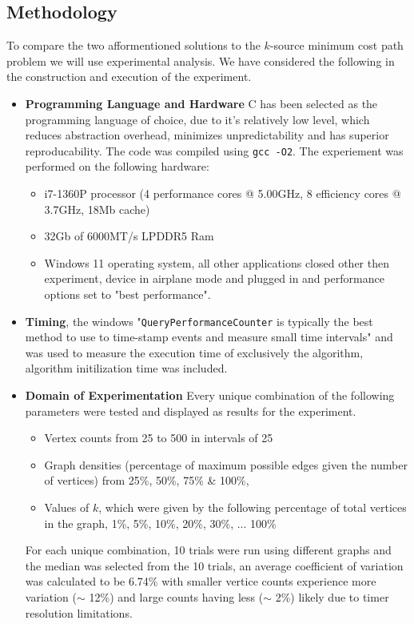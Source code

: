\documentclass{article}
\begin{document}
\subsection*{Methodology}
To compare the two afformentioned solutions to the $k$-source minimum cost path problem we will use experimental analysis. We have considered the following in the construction and execution of the experiment. 
\begin{itemize}
    \item \textbf{Programming Language and Hardware} C has been selected as the programming language of choice, due to it's relatively low level, which reduces abstraction overhead, minimizes unpredictability and has superior reproducability. The code was compiled using \texttt{gcc -O2}. The experiement was performed on the following hardware:
    \begin{itemize}
        \item i7-1360P processor (4 performance cores @ 5.00GHz, 8 efficiency cores @ 3.7GHz, 18Mb cache)
        \item 32Gb of 6000MT/s LPDDR5 Ram
        \item Windows 11 operating system, all other applications closed other then experiment, device in airplane mode and plugged in and performance options set to "best performance".
    \end{itemize}
    \item \textbf{Timing}, the windows "\texttt{QueryPerformanceCounter} is typically the best method to use to time-stamp events and measure small time intervals"\cite{microsoft_qpc} and was used to measure the execution time of exclusively the algorithm, algorithm initilization time was included. 
    \item \textbf{Domain of Experimentation} Every unique combination of the following parameters were tested and displayed as results for the experiment.
    \begin{itemize}
        \item Vertex counts from 25 to 500 in intervals of 25
        \item Graph densities (percentage of maximum possible edges given the number of vertices) from 25\%, 50\%, 75\% \& 100\%, 
        \item Values of $k$, which were given by the following percentage of total vertices in the graph, 1\%, 5\%, 10\%, 20\%, 30\%, ... 100\%
    \end{itemize}
    For each unique combination, 10 trials were run using different graphs and the median was selected from the 10 trials, an average coefficient of variation was calculated to be 6.74\% with smaller vertice counts experience more variation ($\sim$ 12\%) and large counts having less ($\sim$ 2\%) likely due to timer resolution limitations.

\end{itemize}
\end{document}

